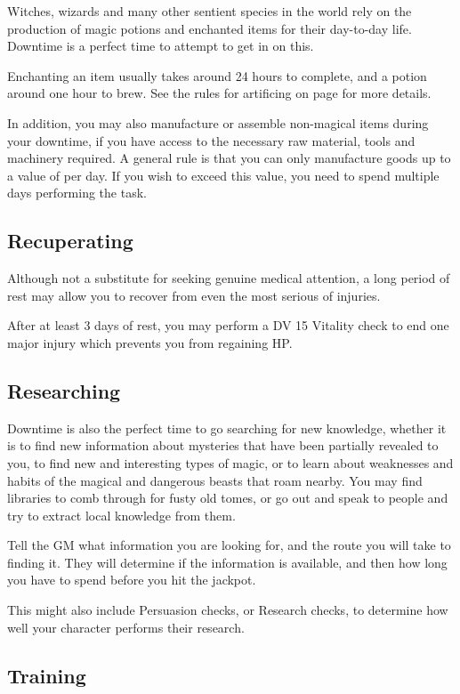 Witches, wizards and many other sentient species in the world rely on the production of magic potions and enchanted items for their day-to-day life. Downtime is a perfect time to attempt to get in on this. 

Enchanting an item usually takes around 24 hours to complete, and a potion around one hour to brew. See the rules for artificing on page \pageref{S:Artificing} for more details. 

In addition, you may also manufacture or assemble non-magical items during your downtime, if you have access to the necessary raw material, tools and machinery required. A general rule is that you can only manufacture goods up to a value of  per day. If you wish to exceed this value, you need to spend multiple days performing the task.

\subsection{Recuperating}

Although not a substitute for seeking genuine medical attention, a long period of rest may allow you to recover from even the most serious of injuries. 

After at least 3 days of rest, you may perform a DV 15 Vitality check to end one major injury which prevents you from regaining HP. 


\subsection{Researching}

Downtime is also the perfect time to go searching for new knowledge, whether it is to find new information about mysteries that have been partially revealed to you, to find new and interesting types of magic, or to learn about weaknesses and habits of the magical and dangerous beasts that roam nearby. You may find libraries to comb through for fusty old tomes, or go out and speak to people and try to extract local knowledge from them. 

Tell the GM what information you are looking for, and the route you will take to finding it. They will determine if the information is available, and then how long you have to spend before you hit the jackpot. 

This might also include Persuasion checks, or Research checks, to determine how well your character performs their research. 
 

\subsection{Training}

